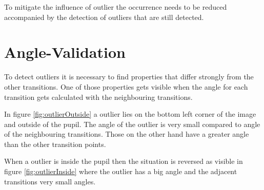 To mitigate the influence of outlier the occurrence needs to be reduced accompanied by the detection of outliers that are still detected.

\section{Angle-Validation}
\label{sec:angleValidation}
To detect outliers it is necessary to find properties that differ strongly from the other transitions. One of those properties gets visible when the angle for each transition gets calculated with the neighbouring transitions. 

In figure \ref{fig:outlierOutside} a outlier lies on the bottom left corner of the image and outside of the pupil. The angle of the outlier is very small compared to angle of the neighbouring transitions. Those on the other hand have a greater angle than the other transition points. 

When a outlier is inside the pupil then the situation is reversed as visible in figure \ref{fig:outlierInside} where the outlier has a big angle and the adjacent transitions very small angles. 

